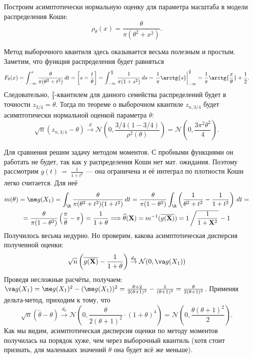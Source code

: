 \begin{example}\label{quantile_example}
    Построим асимптотически нормальную оценку для параметра масштаба в модели распределения Коши:
    \[
    \rho_{\theta}(x) = \frac{\theta}{\pi(\theta^2+x^2)}.
    \]

    Метод выборочного квантиля здесь оказывается весьма полезным и простым. Заметим, что функция распределения будет равняться
    \[
    F_{\theta}(x) = \int_{-\infty}^x \frac{\theta}{\pi(\theta^2+t^2)}\,dt = \left[s = \frac{t}{\theta}\right] = \int_{-\infty}^{\frac{x}{\theta}} \frac{1}{\pi(1+s^2)}\,ds = \left.\frac{1}{\pi}\arctg{s}\right|_{-\infty}^{\frac{x}{\theta}} = \frac{1}{\pi}\arctg{\frac{x}{\theta}} + \frac{1}{2}.
    \]
    Следовательно, $\frac{3}{4}$-квантилем для данного семейства распределений будет в точности $z_{3/4} = \theta$. Тогда по теореме о выборочном квантиле $z_{n, 3/4}$ будет асимптотически нормальной оценкой параметра $\theta$:
    \[
    \sqrt{n}(z_{n, 3/4} - \theta) \stackrel{d}{\to} \mathcal{N}\left(0, \frac{3/4(1 - 3/4)}{\rho^2(\theta)}\right) = \mathcal{N}\left(0, \frac{3\pi^2\theta^2}{4}\right).
    \]
    
    Для сравнения решим задачу методом моментов. С пробными функциями он работать не будет, так как у распределения Коши нет мат. ожидания. Поэтому рассмотрим $g(t)~=~\frac{1}{1+t^2}$ --- она ограничена и её интеграл по плотности Коши легко считается. Для неё
    \begin{gather*}
        m(\theta) = \me g(X_1) = \int_{\R} \frac{\theta}{\pi(\theta^2+t^2)(1+t^2)}\,dt = \frac{\theta}{\pi(1-\theta^2)} \int_{\R} \left(\frac{1}{\theta^2+t^2} - \frac{1}{1+t^2}\right)\,dt = \\
        = \frac{\theta}{\pi(1-\theta^2)} \left(\frac{\pi}{\theta} - \pi\right) = \frac{1}{1 + \theta} \Longrightarrow \widehat{\theta}(\mathbf X) = m^{-1}(\overline{g(\mathbf X)}) = 1\left/\overline{\frac{1}{1+\mathbf X^2}}\right. - 1
    \end{gather*}
    Получилось весьма недурно. Но проверим, какова асимптотическая дисперсия полученной оценки:
    \[
    \sqrt{n}\left(\overline{g(\mathbf X)} - \frac{1}{1+\theta}\right) \stackrel{d_{\theta}}{\to} \mathcal{N}(0, \va g(X_1))
    \]
    Проведя несложные расчёты, получаем: $\va g(X_1) = \me g(X_1)^2 - (\me g(X_1))^2 = \frac{\theta + 2}{2(\theta + 1)^2} - \frac{1}{(\theta+1)^2} = \frac{\theta}{2(\theta + 1)^2}$. Применяя дельта-метод, приходим к тому, что
    \[
    \sqrt{n}\left(\widehat{\theta} - \theta\right) \stackrel{d_{\theta}}{\to} \mathcal{N}\left(0, \frac{\theta}{2(\theta + 1)^2} \cdot (1+\theta)^4\right) = \mathcal{N}\left(0, \frac{\theta(\theta+1)^2}{2}\right).
    \]
    Как мы видим, асимптотическая дисперсия оценки по методу моментов получилась на порядок хуже, чем через выборочный квантиль (хотя стоит признать, для маленьких значений $\theta$ она будет всё же меньше).
\end{example}

